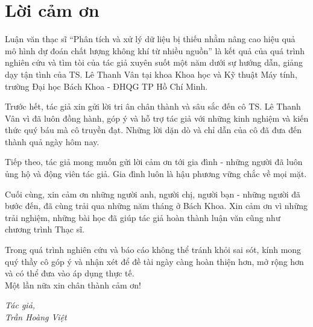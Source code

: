 \chapter*{Lời cảm ơn}
Luận văn thạc sĩ ``Phân tích và xử lý dữ liệu bị thiếu nhằm nâng cao hiệu quả mô hình dự đoán chất lượng không khí từ nhiều nguồn'' là kết quả của quá trình nghiên cứu và tìm tòi của tác giả xuyên suốt một năm dưới sự hướng dẫn, giảng dạy tận tình của TS. Lê Thanh Vân tại khoa Khoa học và Kỹ thuật Máy tính, trường Đại học Bách Khoa - ĐHQG TP Hồ Chí Minh. 

Trước hết, tác giả xin gửi lời tri ân chân thành và sâu sắc đến cô TS. Lê Thanh Vân vì đã luôn đồng hành, góp ý và hỗ trợ tác giả với những kinh nghiệm và kiến thức quý báu mà cô truyền đạt. Những lời dặn dò và chỉ dẫn của cô đã đưa đến thành quả ngày hôm nay. 

Tiếp theo, tác giả mong muốn gửi lời cảm ơn tới gia đình - những người đã luôn ủng hộ và động viên tác giả. Gia đình luôn là hậu phương vững chắc về mọi mặt. 

Cuối cùng, xin cảm ơn những người anh, người chị, người bạn - những người đã bước đến, đã cùng trải qua những năm tháng ở Bách Khoa. Xin cảm ơn vì những trải nghiệm, những bài học đã giúp tác giả hoàn thành luận văn cũng như chương trình Thạc sĩ.

Trong quá trình nghiên cứu và báo cáo không thể tránh khỏi sai sót, kính mong quý thầy cô góp ý và nhận xét để đề tài ngày càng hoàn thiện hơn, mở rộng hơn và có thể đưa vào áp dụng thực tế.\\

Một lần nữa xin chân thành cảm ơn!\\

\begin{flushright}
\textit{
Tác giả,\\
Trần Hoàng Việt
}
\end{flushright}